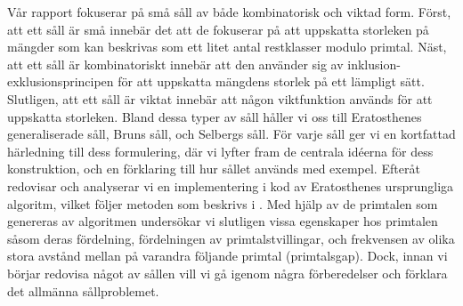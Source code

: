 Vår rapport fokuserar på små såll av både kombinatorisk och viktad form. 
Först, att ett såll är små innebär det att de fokuserar på att uppskatta storleken på mängder som kan beskrivas som ett litet antal restklasser modulo primtal.
 Näst, att ett såll är kombinatoriskt innebär att den använder sig av inklusion-exklusionsprincipen för att uppskatta mängdens storlek på ett lämpligt sätt. 
Slutligen, att ett såll är viktat innebär att någon viktfunktion används för att uppskatta storleken. 
Bland dessa typer av såll håller vi oss till Eratosthenes generaliserade såll, Bruns såll, och Selbergs såll. 
För varje såll ger vi en kortfattad härledning till dess formulering, där vi lyfter fram de centrala idéerna för dess konstruktion, och en förklaring till hur sållet används med exempel. 
Efteråt redovisar och analyserar vi en implementering i kod av Eratosthenes ursprungliga algoritm, vilket följer metoden som beskrivs i \cite{HaraldSieve}.
Med hjälp av de primtalen som genereras av algoritmen undersökar vi slutligen vissa egenskaper hos primtalen såsom deras fördelning, fördelningen av primtalstvillingar, och frekvensen av olika stora avstånd mellan på varandra följande primtal (primtalsgap).
Dock, innan vi börjar redovisa något av sållen vill vi gå igenom några förberedelser och förklara det allmänna sållproblemet.